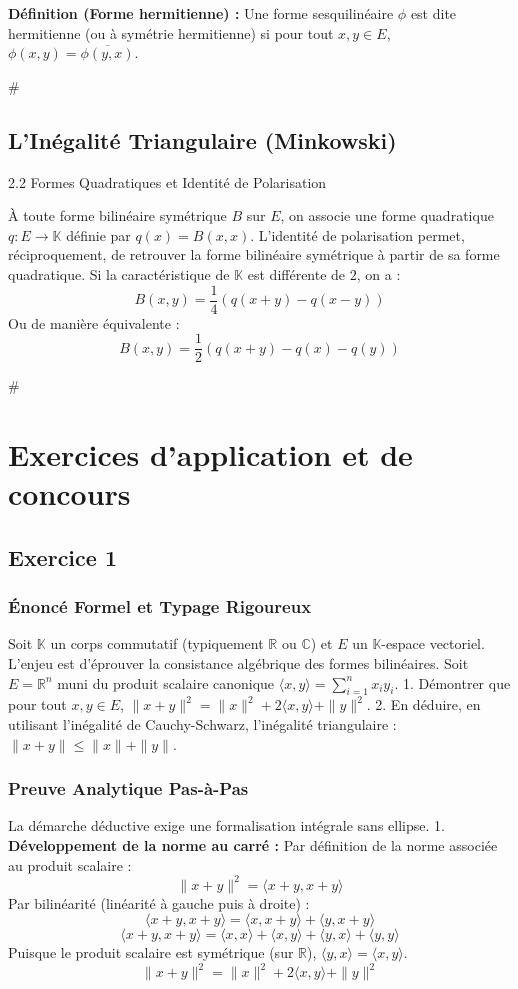 \documentclass[11pt,a4paper]{report}
\begin{document}
\textbf{Définition (Forme hermitienne) :}
Une forme sesquilinéaire $\phi$ est dite hermitienne (ou à symétrie hermitienne) si pour tout $x, y \in E$, $\phi(x, y) = \overline{\phi(y, x)}$.

\#
\section{L'Inégalité Triangulaire (Minkowski)}

2.2 Formes Quadratiques et Identité de Polarisation

À toute forme bilinéaire symétrique $B$ sur $E$, on associe une forme quadratique $q : E \to \mathbb{K}$ définie par $q(x) = B(x, x)$.
L'identité de polarisation permet, réciproquement, de retrouver la forme bilinéaire symétrique à partir de sa forme quadratique. Si la caractéristique de $\mathbb{K}$ est différente de $2$, on a :
$$B(x, y) = \frac{1}{4} \left( q(x + y) - q(x - y) \right)$$
Ou de manière équivalente :
$$B(x, y) = \frac{1}{2} \left( q(x + y) - q(x) - q(y) \right)$$

\#

\chapter{Exercices d'application et de concours}
\section{Exercice 1}


\subsection*{Énoncé Formel et Typage Rigoureux}
Soit $\mathbb{K}$ un corps commutatif (typiquement $\mathbb{R}$ ou $\mathbb{C}$) et $E$ un $\mathbb{K}$-espace vectoriel. L'enjeu est d'éprouver la consistance algébrique des formes bilinéaires.
Soit $E = \mathbb{R}^n$ muni du produit scalaire canonique $\langle x, y \rangle = \sum_{i=1}^n x_i y_i$.
1. Démontrer que pour tout $x, y \in E$, $\|x + y\|^2 = \|x\|^2 + 2\langle x, y \rangle + \|y\|^2$.
2. En déduire, en utilisant l'inégalité de Cauchy-Schwarz, l'inégalité triangulaire : $\|x + y\| \le \|x\| + \|y\|$.

\subsection*{Preuve Analytique Pas-à-Pas}
La démarche déductive exige une formalisation intégrale sans ellipse.
1. \textbf{Développement de la norme au carré :}
   Par définition de la norme associée au produit scalaire :
   $$\|x + y\|^2 = \langle x + y, x + y \rangle$$
   Par bilinéarité (linéarité à gauche puis à droite) :
   $$\langle x + y, x + y \rangle = \langle x, x + y \rangle + \langle y, x + y \rangle$$
   $$\langle x + y, x + y \rangle = \langle x, x \rangle + \langle x, y \rangle + \langle y, x \rangle + \langle y, y \rangle$$
   Puisque le produit scalaire est symétrique (sur $\mathbb{R}$), $\langle y, x \rangle = \langle x, y \rangle$.
   $$\|x + y\|^2 = \|x\|^2 + 2\langle x, y \rangle + \|y\|^2$$
\end{document}
